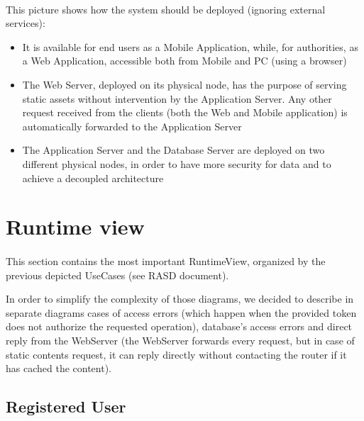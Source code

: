 			\paragraph{}
				This picture shows how the system should be deployed (ignoring external services):
				\begin{itemize}
					\item It is available for end users as a Mobile Application, while, for authorities, as a Web Application, accessible both from Mobile and PC (using a browser)
					\item The Web Server, deployed on its physical node, has the purpose of serving static assets without intervention by the Application Server. Any other request received from the clients (both the Web and Mobile application) is automatically forwarded to the Application Server
					\item The Application Server and the Database Server are deployed on two different physical nodes, in order to have more security for data and to achieve a decoupled architecture
				\end{itemize}
		\section{Runtime view}
			\paragraph{}
				This section contains the most important RuntimeView, organized by the previous depicted UseCases (see RASD document).
				
				In order to simplify the complexity of those diagrams, we decided to describe in separate diagrams cases of access errors (which happen when the provided token does not authorize the requested operation), database's access errors and direct reply from the WebServer (the WebServer forwards every request, but in case of static contents request, it can reply directly without contacting the router if it has cached the content).
			\subsection{Registered User}
